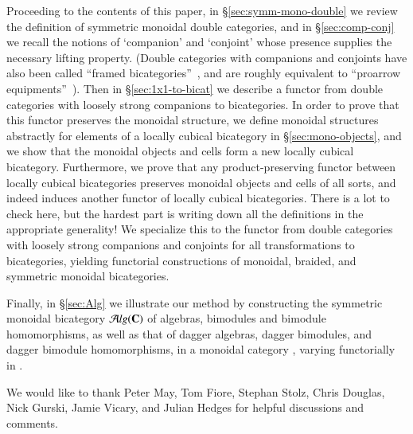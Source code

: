 Proceeding to the contents of this paper, in
\S\ref{sec:symm-mono-double} we review the definition of symmetric
monoidal double categories, and in \S\ref{sec:comp-conj} we recall the
notions of `companion' and `conjoint' whose presence supplies the
necessary lifting property.
(Double categories with companions and conjoints have also been called ``framed bicategories''~\cite{shulman:frbi}, and are roughly equivalent to ``proarrow equipments''~\cite{wood:proarrows-i}).
Then in \S\ref{sec:1x1-to-bicat} we describe a functor from double categories with loosely strong companions to bicategories.
In order to prove that this functor preserves the monoidal structure, we define monoidal structures abstractly for elements of a locally cubical bicategory in \S\ref{sec:mono-objects}, and we show that the monoidal objects and cells form a new locally cubical bicategory. Furthermore, we prove that any product-preserving functor between locally cubical bicategories preserves monoidal objects and cells of all sorts, and indeed induces another functor of locally cubical bicategories.
There is a lot to check here, but the hardest part is writing down all the definitions in the appropriate generality! We specialize this to the functor from double categories with loosely strong companions and conjoints for all transformations to bicategories, yielding functorial constructions of monoidal, braided, and symmetric monoidal bicategories.


Finally, in \S\ref{sec:Alg} we illustrate our method by constructing the symmetric monoidal bicategory ${\mathcal{A}}lg(\mathbf{C})$ of algebras, bimodules and bimodule homomorphisms, as well as that of dagger algebras, dagger bimodules, and dagger bimodule homomorphisms, in a monoidal category \bC, varying functorially in \bC.

We would like to thank Peter May, Tom Fiore, Stephan Stolz, Chris
Douglas, Nick Gurski, Jamie Vicary, and Julian Hedges for helpful discussions and comments.

